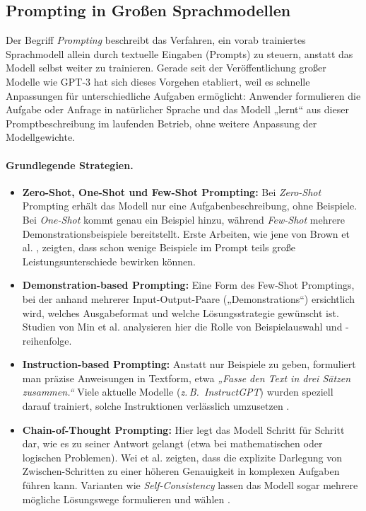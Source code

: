 \documentclass[11pt,a4paper]{article}
\begin{document}
\subsection{Prompting in Großen Sprachmodellen}
\label{sec:prompting}

Der Begriff \emph{Prompting} beschreibt das Verfahren, ein vorab trainiertes Sprachmodell allein durch textuelle Eingaben (Prompts) zu steuern, anstatt das Modell selbst weiter zu trainieren. Gerade seit der Veröffentlichung großer Modelle wie GPT-3 \cite{brown2020} hat sich dieses Vorgehen etabliert, weil es schnelle Anpassungen für unterschiedliche Aufgaben ermöglicht: Anwender formulieren die Aufgabe oder Anfrage in natürlicher Sprache und das Modell „lernt“ aus dieser Promptbeschreibung im laufenden Betrieb, ohne weitere Anpassung der Modellgewichte.

\paragraph{Grundlegende Strategien.}
\begin{itemize}
  \item \textbf{Zero-Shot, One-Shot und Few-Shot Prompting:}  
  Bei \emph{Zero-Shot} Prompting erhält das Modell nur eine Aufgabenbeschreibung, ohne Beispiele. Bei \emph{One-Shot} kommt genau ein Beispiel hinzu, während \emph{Few-Shot} mehrere Demonstrationsbeispiele bereitstellt. Erste Arbeiten, wie jene von Brown et al. \cite{brown2020}, zeigten, dass schon wenige Beispiele im Prompt teils große Leistungsunterschiede bewirken können.

  \item \textbf{Demonstration-based Prompting:}  
  Eine Form des Few-Shot Promptings, bei der anhand mehrerer Input-Output-Paare („Demonstrations“) ersichtlich wird, welches Ausgabeformat und welche Lösungsstrategie gewünscht ist. Studien von Min et al. \cite{min2022} analysieren hier die Rolle von Beispielauswahl und -reihenfolge.

  \item \textbf{Instruction-based Prompting:}  
  Anstatt nur Beispiele zu geben, formuliert man präzise Anweisungen in Textform, etwa \emph{„Fasse den Text in drei Sätzen zusammen.“} Viele aktuelle Modelle (\emph{z.\,B.\ InstructGPT}) wurden speziell darauf trainiert, solche Instruktionen verlässlich umzusetzen \cite{ouyang2022}.

  \item \textbf{Chain-of-Thought Prompting:}  
  Hier legt das Modell Schritt für Schritt dar, wie es zu seiner Antwort gelangt (etwa bei mathematischen oder logischen Problemen). Wei et al. \cite{wei2022} zeigten, dass die explizite Darlegung von Zwischen-Schritten zu einer höheren Genauigkeit in komplexen Aufgaben führen kann. Varianten wie \emph{Self-Consistency} lassen das Modell sogar mehrere mögliche Lösungswege formulieren und wählen \cite{wang2022selfconsistency}.

\end{itemize}
\end{document}
